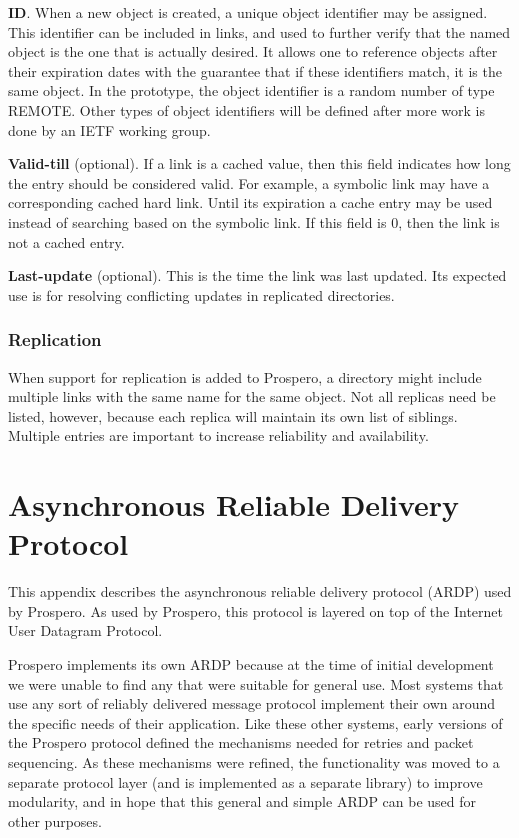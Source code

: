 \begin{description}
\item {\bf ID}.  When a new object is created, a unique
object identifier may be assigned.  This identifier can be included in
links, and used to further verify that the named object is the one
that is actually desired.  It allows one to reference objects after
their expiration dates with the guarantee that if these identifiers
match, it is the same object.  In the prototype, the object identifier
is a random number of type REMOTE.  Other types of object identifiers
will be defined after more work is done by an IETF working group.

\item {\bf Valid-till} (optional).  If a link is a cached value, then
this field indicates how long the entry should be considered valid.
For example, a symbolic link may have a corresponding cached hard
link.  Until its expiration a cache entry may be used instead of
searching based on the symbolic link.  If this field is 0, then the
link is not a cached entry.

\item {\bf Last-update} (optional).  This is the time the link was
last updated.  Its expected use is for resolving conflicting updates
in replicated directories.

\end{description}

\subsection{Replication}

When support for replication is added to Prospero, a directory might
include multiple links with the same name for the same object. Not all
replicas need be listed, however, because each replica will maintain
its own list of siblings.  Multiple entries are important to increase
reliability and availability.

\chapter{Asynchronous Reliable Delivery Protocol\label{ardp}}

This appendix describes the asynchronous reliable delivery protocol
(ARDP) used by Prospero.  As used by Prospero, this protocol is
layered on top of the Internet User Datagram Protocol. 

Prospero implements its own ARDP because at the time of initial
development we were unable to find any that were suitable for general
use.  Most systems that use any sort of reliably delivered message
protocol implement their own around the specific needs of their
application.  Like these other systems, early versions of the Prospero
protocol defined the mechanisms needed for retries and packet
sequencing.  As these mechanisms were refined, the functionality was
moved to a separate protocol layer (and is implemented as a separate
library) to improve modularity, and in hope that this general and
simple ARDP can be used for other purposes.

